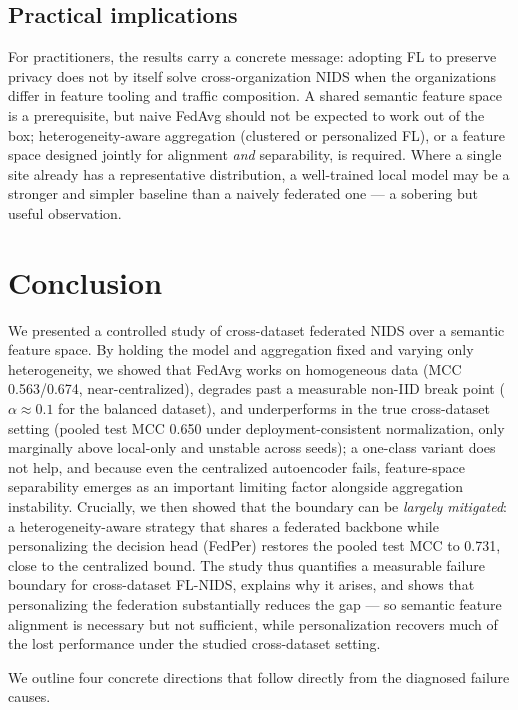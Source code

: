 \documentclass[11pt,a4paper]{article}
\begin{document}
\subsection{Practical implications}
For practitioners, the results carry a concrete message: adopting FL to preserve
privacy does not by itself solve cross-organization NIDS when the organizations
differ in feature tooling and traffic composition. A shared semantic feature space
is a prerequisite, but naive FedAvg should not be expected to work out of the box;
heterogeneity-aware aggregation (clustered or personalized FL), or a feature space
designed jointly for alignment \emph{and} separability, is required. Where a
single site already has a representative distribution, a well-trained local model
may be a stronger and simpler baseline than a naively federated one --- a sobering
but useful observation.

\section{Conclusion}
We presented a controlled study of cross-dataset federated NIDS over a semantic
feature space. By holding the model and aggregation fixed and varying only
heterogeneity, we showed that FedAvg works on homogeneous data (MCC 0.563/0.674,
near-centralized), degrades past a measurable non-IID break point
(\(\alpha\approx0.1\) for the balanced dataset), and underperforms in the true
cross-dataset setting (pooled test MCC 0.650 under deployment-consistent
normalization, only marginally above local-only and unstable across seeds); a
one-class variant does not help, and because even the centralized autoencoder
fails, feature-space
separability emerges as an important limiting factor alongside aggregation
instability. Crucially, we then showed that the boundary can be \emph{largely
mitigated}: a heterogeneity-aware strategy that shares a federated backbone while
personalizing the decision head (FedPer) restores the pooled test MCC to 0.731,
close to the centralized bound. The study thus quantifies a measurable failure boundary
for cross-dataset FL-NIDS, explains why it arises, and shows that personalizing
the federation substantially reduces the gap --- so semantic feature alignment is
necessary but not sufficient, while personalization recovers much of the lost
performance under the studied cross-dataset setting.

We outline four concrete directions that follow directly from the diagnosed
failure causes.
\end{document}
